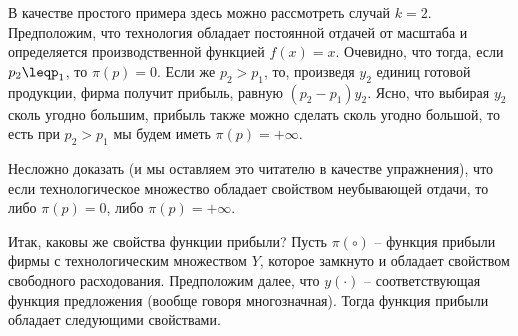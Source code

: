 В качестве простого примера здесь можно рассмотреть случай $k=2$. Предположим, что
технология обладает постоянной отдачей от масштаба и определяется производственной
функцией $f(x)=x$. Очевидно, что тогда, если $p_2\leqp_1$, то $\pi(p)=0$. Если же
$p_2>p_1$, то, произведя $y_2$ единиц готовой продукции, фирма получит прибыль,
равную $(p_2-p_1)y_2$. Ясно, что выбирая  $y_2$ сколь угодно большим, прибыль также
можно сделать сколь угодно большой, то есть при $p_2>p_1$ мы будем иметь
$\pi(p)=+\infty$.

Несложно доказать (и мы оставляем это читателю в качестве упражнения), что
если технологическое множество обладает свойством неубывающей отдачи, то либо
$\pi(p)=0$, либо $\pi(p)=+\infty$.

Итак, каковы же свойства функции прибыли?
Пусть $\pi(\circ )$ -- функция прибыли фирмы с технологическим
множеством $Y$, которое замкнуто и обладает свойством свободного
расходования. Предположим далее, что $y(\cdot)$ -- соответствующая функция
предложения (вообще говоря многозначная). Тогда функция прибыли обладает следующими свойствами.

